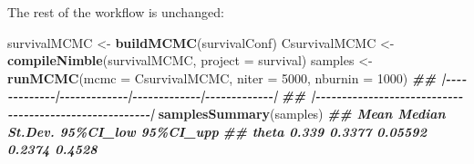 \documentclass[
  12pt,
]{krantz}
\newenvironment{Shaded}{\begin{snugshade}}{\end{snugshade}}
\newcommand{\AttributeTok}[1]{\textcolor[rgb]{0.13,0.29,0.53}{#1}}
\newcommand{\CommentTok}[1]{\textcolor[rgb]{0.56,0.35,0.01}{\textit{#1}}}
\newcommand{\DecValTok}[1]{\textcolor[rgb]{0.00,0.00,0.81}{#1}}
\newcommand{\DocumentationTok}[1]{\textcolor[rgb]{0.56,0.35,0.01}{\textbf{\textit{#1}}}}
\newcommand{\FloatTok}[1]{\textcolor[rgb]{0.00,0.00,0.81}{#1}}
\newcommand{\FunctionTok}[1]{\textcolor[rgb]{0.13,0.29,0.53}{\textbf{#1}}}
\newcommand{\NormalTok}[1]{#1}
\newcommand{\OtherTok}[1]{\textcolor[rgb]{0.56,0.35,0.01}{#1}}
\newcommand{\SpecialCharTok}[1]{\textcolor[rgb]{0.81,0.36,0.00}{\textbf{#1}}}
\newcommand{\StringTok}[1]{\textcolor[rgb]{0.31,0.60,0.02}{#1}}
\begin{document}
\begin{Shaded}
\end{Shaded}

The rest of the workflow is unchanged:

\begin{Shaded}
\begin{Highlighting}[]
\NormalTok{survivalMCMC }\OtherTok{\textless{}{-}} \FunctionTok{buildMCMC}\NormalTok{(survivalConf)}
\NormalTok{CsurvivalMCMC }\OtherTok{\textless{}{-}} \FunctionTok{compileNimble}\NormalTok{(survivalMCMC, }
                               \AttributeTok{project =}\NormalTok{ survival)}
\NormalTok{samples }\OtherTok{\textless{}{-}} \FunctionTok{runMCMC}\NormalTok{(}\AttributeTok{mcmc =}\NormalTok{ CsurvivalMCMC, }
                   \AttributeTok{niter =} \DecValTok{5000}\NormalTok{, }
                   \AttributeTok{nburnin =} \DecValTok{1000}\NormalTok{)}
\DocumentationTok{\#\# |{-}{-}{-}{-}{-}{-}{-}{-}{-}{-}{-}{-}{-}|{-}{-}{-}{-}{-}{-}{-}{-}{-}{-}{-}{-}{-}|{-}{-}{-}{-}{-}{-}{-}{-}{-}{-}{-}{-}{-}|{-}{-}{-}{-}{-}{-}{-}{-}{-}{-}{-}{-}{-}|}
\DocumentationTok{\#\# |{-}{-}{-}{-}{-}{-}{-}{-}{-}{-}{-}{-}{-}{-}{-}{-}{-}{-}{-}{-}{-}{-}{-}{-}{-}{-}{-}{-}{-}{-}{-}{-}{-}{-}{-}{-}{-}{-}{-}{-}{-}{-}{-}{-}{-}{-}{-}{-}{-}{-}{-}{-}{-}{-}{-}|}
\FunctionTok{samplesSummary}\NormalTok{(samples)}
\DocumentationTok{\#\#        Mean Median St.Dev. 95\%CI\_low 95\%CI\_upp}
\DocumentationTok{\#\# theta 0.339 0.3377 0.05592    0.2374    0.4528}
\end{Highlighting}
\end{Shaded}
\end{document}
